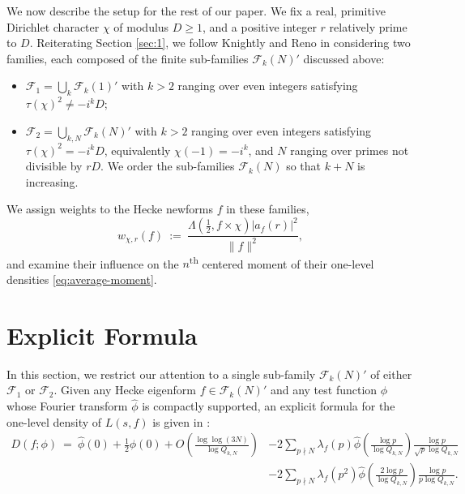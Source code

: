 \documentclass[12pt, reqno,oneside]{amsart}
\theoremstyle{plain}
\theoremstyle{definition}
\theoremstyle{remark}
\theoremstyle{plain}
\numberwithin{equation}{section}
\begin{document}
We now describe the setup for the rest of our paper. We fix a real, primitive Dirichlet character $\chi$ of modulus $D\geq1$, and a positive integer $r$ relatively prime to $D$. Reiterating Section \ref{sec:1}, we follow Knightly and Reno \cite{KR18} in considering two families, each composed of the finite sub-families $\mathcal{F}_k(N)'$ discussed above:
\begin{itemize}
    \item $\mathcal{F}_1=\bigcup_k \mathcal{F}_k(1)'$ with $k>2$ ranging over even integers satisfying $\tau(\chi)^2\neq-i^kD$;
    \item $\mathcal{F}_2=\bigcup_{k,N}\mathcal{F}_k(N)'$ with $k>2$ ranging over even integers satisfying $\tau(\chi)^2=-i^kD$, equivalently $\chi(-1)=-i^k$, and $N$ ranging over primes not divisible by $rD$. We order the sub-families $\mathcal{F}_k(N)$ so that $k+N$ is increasing.
\end{itemize}
We assign weights to the Hecke newforms $f$ in these families,
\begin{equation}
  w_{\chi,r}(f) \ := \ \frac{\Lambda\left(\frac{1}{2},f\times\chi\right)|a_f(r)|^2}{\lVert f\rVert^2},
\end{equation} 
and examine their influence on the $n$\textsuperscript{th} centered moment of their one-level densities \eqref{eq:average-moment}.

%
%

\section{Explicit Formula}\label{sec:3}

In this section, we restrict our attention to a single sub-family $\mathcal{F}_k(N)'$ of either $\mathcal{F}_1$ or $\mathcal{F}_2$. Given any Hecke eigenform $f\in\mathcal{F}_k(N)'$ and any test function $\phi$ whose Fourier transform $\widehat\phi$ is compactly supported, an explicit formula for the one-level density of $L(s,f)$ is given in \cite[(4.18)]{ILS00}:
\begin{align}
\nonumber
D(f;\phi) \ = \ \widehat{\phi}(0)+\frac{1}{2}\phi(0)+O\left(\frac{\log\log(3N)}{\log Q_{k,N}}\right)&-2\sum_{p\nmid N}\lambda_f(p)\widehat{\phi}\left(\frac{\log p}{\log Q_{k,N}}\right)\frac{\log p}{\sqrt{p}\log Q_{k,N}}\\
\label{eq:second-moment} &-2\sum_{p\nmid N}\lambda_f(p^2)\widehat{\phi}\left(\frac{2\log p}{\log Q_{k,N}}\right)\frac{\log p}{p\log Q_{k,N}}.
\end{align}
\end{document}
